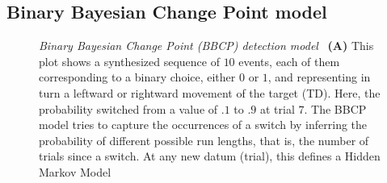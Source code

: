 \documentclass[12pt,english]{article}%
\newcommand{\seeFig}[1]{Figure~\ref{fig:#1}}
\begin{document}
\subsection{Binary Bayesian Change Point model}
\begin{figure}%
\caption{\emph{Binary Bayesian Change Point (BBCP) detection model}
~\textbf{(A)} This plot shows a synthesized sequence of $10$ events,
each of them corresponding to a binary choice, either $0$ or $1$,
and representing in turn a leftward or rightward movement of the target (TD).
Here, the probability switched from a value of $.1$ to $.9$ at trial $7$.
The BBCP model tries to capture the occurrences of a switch 
by inferring the probability of different possible run lengths,
that is, the number of trials since a switch.
At any new datum (trial), this defines a Hidden Markov Model
}
\end{figure}
\end{document}
